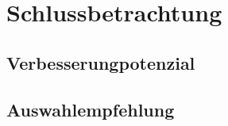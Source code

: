 \newpage
\section{Schlussbetrachtung}

\subsection{Verbesserungpotenzial}

\subsection{Auswahlempfehlung}